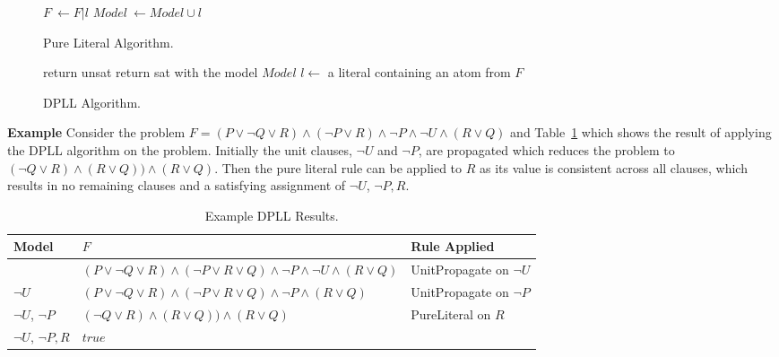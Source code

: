 \documentclass[]{final_report}
\begin{document}
\begin{figure}[t]
\begin{algorithmic}
		\State $\mathit{F}~\gets \mathit{F}|l$
		\State $Model~\gets Model \cup {l}$
	\EndWhile
\EndFunction    
\end{algorithmic}

\caption{\label{fig:dppl-pure-literal} Pure Literal Algorithm.}
\end{figure}

\begin{figure}[t]
\begin{algorithmic}
	\State {}
		\State return unsat
	\EndIf
	\State {}
		\State return sat with the model $Model$
	\EndIf
	\State $l \gets$ a literal containing an atom from $\mathit{F}$
	\State {}
	\State {}
\EndFunction    
\end{algorithmic}
\caption{\label{fig:dppl-classic-algo} DPLL Algorithm.}
\end{figure}

\textbf{Example}
Consider the problem $F = (P \lor \lnot{Q} \lor R) \land (\lnot{P} \lor R) \land \lnot{P} \land \lnot{U} \land (R \lor Q)$ and Table~\ref{table:dpll-results} which shows the result of applying the DPLL algorithm on the problem. Initially the unit clauses, $\lnot{U}$ and $\lnot{P}$, are propagated which reduces the problem to $(\lnot{Q} \lor R) \land (R \lor Q)) \land (R \lor Q)$. Then the pure literal rule can be applied to $R$ as its value is consistent across all clauses, which results in no remaining clauses and a satisfying assignment of $\lnot{U}$, $\lnot{P}, R$.

\begin{table}[t]
\centering
\begin{tabular}{|l|l|l|}
\hline
Model & $F$ & Rule Applied \\ \hline
{} & $(P \lor \lnot{Q} \lor R) \land (\lnot{P} \lor R \lor Q) \land \lnot{P} \land \lnot{U} \land (R \lor Q)$ & UnitPropagate on $\lnot{U}$   \\ \hline
{$\lnot{U}$} & $(P \lor \lnot{Q} \lor R) \land (\lnot{P} \lor R \lor Q) \land \lnot{P} \land (R \lor Q)$ & UnitPropagate on $\lnot{P}$   \\ \hline
{$\lnot{U}$, $\lnot{P}$} & $(\lnot{Q} \lor R) \land (R \lor Q)) \land (R \lor Q)$ & PureLiteral on $R$    \\ \hline
{$\lnot{U}$, $\lnot{P}, R$} & $true$ &     \\ \hline
\end{tabular}
\caption{Example DPLL Results.}
\label{table:dpll-results}
\end{table}
\end{document}
